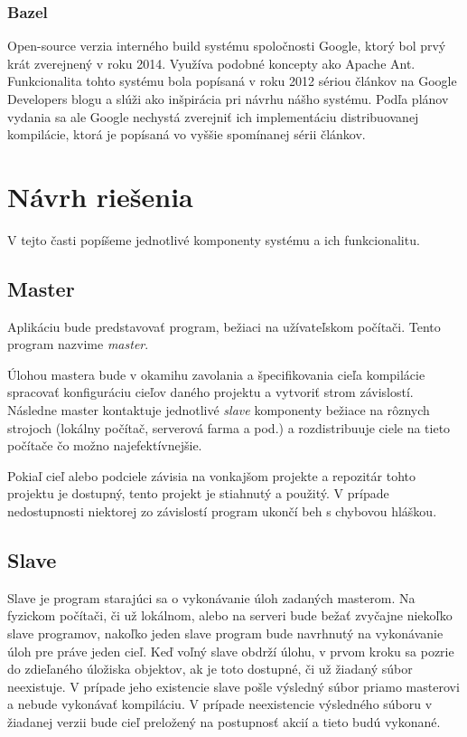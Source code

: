 \subsubsection{Bazel}
Open-source verzia interného build systému spoločnosti Google, ktorý bol prvý krát
zverejnený v roku 2014. Využíva podobné koncepty ako Apache Ant. Funkcionalita tohto
systému bola popísaná v roku 2012 sériou článkov na Google Developers blogu
\cite{BlazeDesign} a slúži ako inšpirácia pri návrhu nášho systému. Podľa plánov
vydania \cite{BazelRoadmap} sa ale Google nechystá zverejniť ich implementáciu
distribuovanej kompilácie, ktorá je popísaná vo vyššie spomínanej sérii článkov.

\section{N\'{a}vrh rie\v{s}enia}
\label{sec:solution}
V tejto časti popíšeme jednotlivé komponenty systému a ich funkcionalitu.

\subsection{Master}
\label{sub:solution:master}
Aplikáciu bude predstavovať program, bežiaci na užívateľskom počítači. Tento program
nazvime {\it master}.

Úlohou mastera bude v okamihu zavolania a špecifikovania cieľa kompilácie spracovať
konfiguráciu cieľov daného projektu a vytvoriť strom závislostí. Následne master
kontaktuje jednotlivé {\it slave} komponenty bežiace na rôznych strojoch (lokálny
počítač, serverová farma a pod.) a rozdistribuuje ciele na tieto počítače čo možno
najefektívnejšie.

Pokiaľ cieľ alebo podciele závisia na vonkajšom projekte a repozitár tohto projektu
je dostupný, tento projekt je stiahnutý a použitý. V prípade nedostupnosti niektorej
zo závislostí program ukončí beh s chybovou hláškou.

\subsection{Slave}
\label{sub:solution:slave}
Slave je program starajúci sa o vykonávanie úloh zadaných masterom. Na fyzickom počítači,
či už lokálnom, alebo na serveri bude bežať zvyčajne niekoľko slave programov, nakoľko
jeden slave program bude navrhnutý na vykonávanie úloh pre práve jeden cieľ. Keď voľný
slave obdrží úlohu, v prvom kroku sa pozrie do zdieľaného úložiska objektov, ak je
toto dostupné, či už žiadaný súbor neexistuje. V prípade jeho existencie slave
pošle výsledný súbor priamo masterovi a nebude vykonávať kompiláciu. V prípade
neexistencie výsledného súboru v žiadanej verzii bude cieľ preložený na postupnosť
akcií a tieto budú vykonané.


